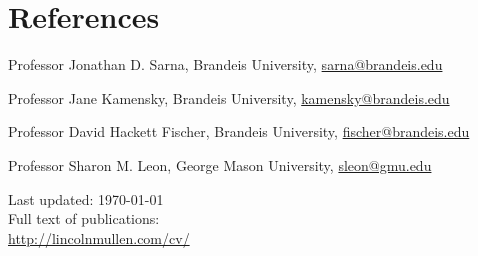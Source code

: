 \documentclass[11pt]{article}
\begin{document}
\section{References}

Professor Jonathan D. Sarna, Brandeis University,
\href{mailto:sarna@brandeis.edu}{sarna@brandeis.edu}

Professor Jane Kamensky, Brandeis University, 
\href{mailto:kamensky@brandeis.edu}{kamensky@brandeis.edu}

Professor David Hackett Fischer, Brandeis University, 
\href{mailto:fischer@brandeis.edu}{fischer@brandeis.edu}

Professor Sharon M. Leon, George Mason University,
\href{mailto:sleon@gmu.edu}{sleon@gmu.edu}

\vfill{}

\begin{center}
  {\scriptsize 
    Last updated: \today\\[.25cm]
    Full text of publications:\\
    \href{http://lincolnmullen.com/cv/}{http://lincolnmullen.com/cv/}\\[.1cm]
  }
\end{center}
\end{document}

